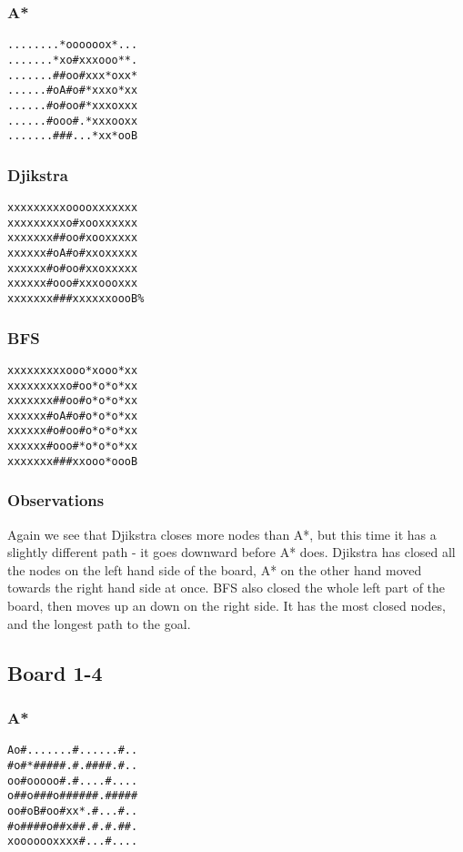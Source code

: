 \documentclass[11pt,a4paper]{article}
\begin{document}
\subsubsection*{A*}
\begin{lstlisting}
........*oooooox*...
.......*xo#xxxooo**.
.......##oo#xxx*oxx*
......#oA#o#*xxxo*xx
......#o#oo#*xxxoxxx
......#ooo#.*xxxooxx
.......###...*xx*ooB
\end{lstlisting}
\subsubsection*{Djikstra}
\begin{lstlisting}
xxxxxxxxxooooxxxxxxx
xxxxxxxxxo#xooxxxxxx
xxxxxxx##oo#xooxxxxx
xxxxxx#oA#o#xxoxxxxx
xxxxxx#o#oo#xxoxxxxx
xxxxxx#ooo#xxxoooxxx
xxxxxxx###xxxxxxoooB%
\end{lstlisting}

\subsubsection*{BFS}
\begin{lstlisting}
xxxxxxxxxooo*xooo*xx
xxxxxxxxxo#oo*o*o*xx
xxxxxxx##oo#o*o*o*xx
xxxxxx#oA#o#o*o*o*xx
xxxxxx#o#oo#o*o*o*xx
xxxxxx#ooo#*o*o*o*xx
xxxxxxx###xxooo*oooB
\end{lstlisting}
\subsubsection*{Observations}
Again we see that Djikstra closes more nodes than A*, but this time it has a slightly different path - it goes downward before A* does. Djikstra has closed all the nodes on the left hand side of the board, A* on the other hand moved towards the right hand side at once. BFS also closed the whole left part of the board, then moves up an down on the right side. It has the most closed nodes, and the longest path to the goal. 

\subsection*{Board 1-4}
\subsubsection*{A*}
\begin{lstlisting}
Ao#.......#......#..
#o#*#####.#.####.#..
oo#ooooo#.#....#....
o##o###o######.#####
oo#oB#oo#xx*.#...#..
#o####o##x##.#.#.##.
xooooooxxxx#...#....
\end{lstlisting}
\end{document}
